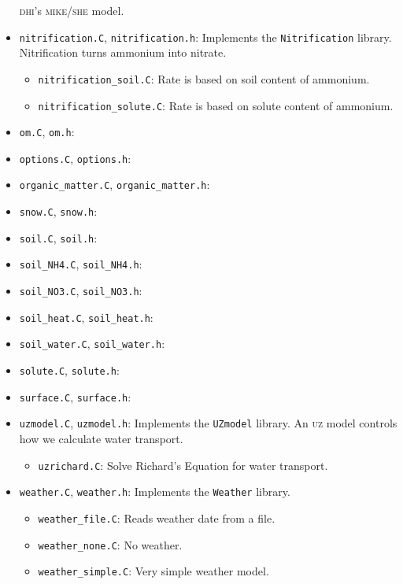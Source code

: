 \documentclass{article}
\newcommand{\code}[1]{\texttt{#1}}
\newcommand{\file}[1]{\texttt{#1}}
\begin{document}
\begin{itemize}
  \textsc{dhi}'s \textsc{mike/she} model.
\item \file{nitrification.C}, \file{nitrification.h}: Implements the
  \code{Nitrification} library.  Nitrification turns ammonium into
  nitrate.
  \begin{itemize}
  \item \file{nitrification\_soil.C}:  Rate is based on soil content
    of ammonium.
  \item \file{nitrification\_solute.C}: Rate is based on solute content
    of ammonium.
  \end{itemize}
\item \file{om.C}, \file{om.h}:
\item \file{options.C}, \file{options.h}:
\item \file{organic\_matter.C}, \file{organic\_matter.h}:
\item \file{snow.C}, \file{snow.h}:
\item \file{soil.C}, \file{soil.h}:
\item \file{soil\_NH4.C}, \file{soil\_NH4.h}:
\item \file{soil\_NO3.C}, \file{soil\_NO3.h}:
\item \file{soil\_heat.C}, \file{soil\_heat.h}:
\item \file{soil\_water.C}, \file{soil\_water.h}:
\item \file{solute.C}, \file{solute.h}:
\item \file{surface.C}, \file{surface.h}:
\item \file{uzmodel.C}, \file{uzmodel.h}:  Implements the
  \code{UZmodel} library.  An \textsc{uz} model controls how we
  calculate water transport.
  \begin{itemize}
  \item \file{uzrichard.C}: Solve Richard's Equation for water
    transport. 
  \end{itemize}
\item \file{weather.C}, \file{weather.h}:  Implements the
  \code{Weather} library.
  \begin{itemize}
  \item \file{weather\_file.C}: Reads weather date from a file.
  \item \file{weather\_none.C}: No weather.
  \item \file{weather\_simple.C}: Very simple weather model.
  \end{itemize}
\end{itemize}
\end{document}
